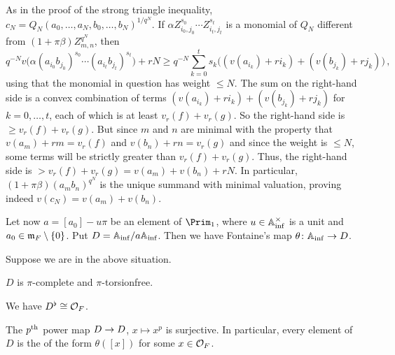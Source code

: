 \documentclass[a4paper, 10pt, oneside, DIV=9, chapterprefix=true, numbers=enddot,bibliography=totoc]{scrbook}
\begin{document}
\begin{proof*}
	As in the proof of the strong triangle inequality, $c_N=Q_N(a_0,\dotsc,a_N,b_0,\dotsc,b_N)^{1/q^N}$. If $\alpha Z_{i_0,j_0}^{s_0}\dotsm Z_{i_t,j_t}^{s_t}$ is a monomial of $Q_N$ different from $(1+\pi\beta)Z_{m,n}^{q^N}$, then
	\begin{equation*}
		q^{-N}v\big(\alpha (a_{i_0}b_{j_0})^{s_0}\dotsm (a_{i_t}b_{j_t})^{s_t}\big)+rN\geq q^{-N}\sum_{k=0}^ts_k\big((v(a_{i_k})+ri_k)+(v(b_{j_k})+rj_k)\big)\,,
	\end{equation*}
	using that the monomial in question has weight $\leq N$. The sum on the right-hand side is a convex combination of terms $(v(a_{i_k})+ri_k)+(v(b_{j_k})+rj_k)$ for $k=0,\dotsc,t$, each of which is at least $v_r(f)+v_r(g)$. So the right-hand side is $\geq v_r(f)+v_r(g)$. But since $m$ and $n$ are minimal with the property that $v(a_m)+rm=v_r(f)$ and $v(b_n)+rn=v_r(g)$ and since the weight is $\leq N$, some terms will be strictly greater than $v_r(f)+v_r(g)$. Thus, the right-hand side is $>v_r(f)+v_r(g)=v(a_m)+v(b_n)+rN$. In particular, $(1+\pi\beta)(a_mb_n)^{q^N}$ is the unique summand with minimal valuation, proving indeed $v(c_N)=v(a_m)+v(b_n)$.
\end{proof*}
Let now $a=[a_0]-u\pi$ be an element of $\Prim_1$, where $u\in\mathbb{A}_{\mathrm{inf}}^\times$ is a unit and $a_0\in\mathfrak{m}_F\setminus \{0\}$. Put $D=\mathbb{A}_{\mathrm{inf}}/a\mathbb{A}_{\mathrm{inf}}$. Then we have Fontaine's map $\theta\colon \IA_\inf\morphism D$.
\begin{prop}\label{prop:D}
	Suppose we are in the above situation.
	\begin{numerate}
		\item $D$ is $\pi$-complete and $\pi$-torsionfree.
		\item We have $D^\flat\cong \mathcal{O}_F$.
		\item The $p^{\text{th}}$ power map $D\morphism D$, $x\mapsto x^p$ is surjective. In particular, every element of $D$ is the of the form $\theta([x])$ for some $x\in\mathcal{O}_F$.
	\end{numerate}
\end{prop}
\end{document}

